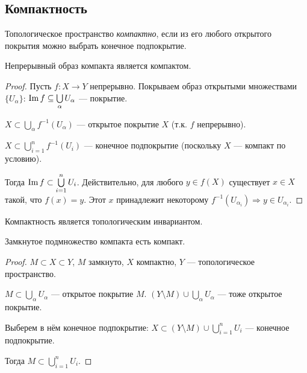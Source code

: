 \subsection{Компактность}
\begin{definition}
    Топологическое пространство \textit{компактно}, если из его любого открытого покрытия можно выбрать конечное подпокрытие.
\end{definition}

\begin{statement}
    Непрерывный образ компакта является компактом.
\end{statement}
\begin{proof}
    Пусть $f: X \to Y$ непрерывно. Покрываем образ открытыми множествами $\{U_{\alpha}\}$: $\operatorname*{Im} f \subseteq \bigcup\limits_{\alpha} U_{\alpha}$ — покрытие.

    $X \subset \bigcup\limits_{\alpha} f^{-1}(U_{\alpha})$ — открытое покрытие $X$ (т.к. $f$ непрерывно).

    $X \subset \bigcup\limits_{i = 1}^{n} f^{-1}(U_{i})$ — конечное подпокрытие (поскольку $X$ — компакт по условию).

    Тогда $\operatorname*{Im} f \subset \bigcup\limits_{i = 1}^n U_{i}$. Действительно, для любого $y \in f(X)$ существует $x \in X$ такой, что $f(x) = y$. Этот $x$ принадлежит некоторому $f^{-1}(U_{\alpha_i}) \Longrightarrow y \in U_{\alpha_i}$.
\end{proof}

\begin{remark}
    Компактность является топологическим инвариантом.
\end{remark}

\begin{statement}
    Замкнутое подмножество компакта есть компакт.
\end{statement}
\begin{proof}
    $M \subset X \subset Y$, $M$ замкнуто, $X$ компактно, $Y$ — топологическое пространство.

    $M \subset \bigcup\limits_{\alpha} U_{\alpha}$ — открытое покрытие $M$.
    $(Y \setminus M) \cup \bigcup\limits_{\alpha} U_{\alpha}$ — тоже открытое покрытие.

    Выберем в нём конечное подпокрытие:
    $X \subset (Y \setminus M) \cup \bigcup\limits_{i = 1}^n U_i$ — конечное подпокрытие.

    Тогда $M \subset \bigcup\limits_{i = 1}^n U_i$.
\end{proof}


